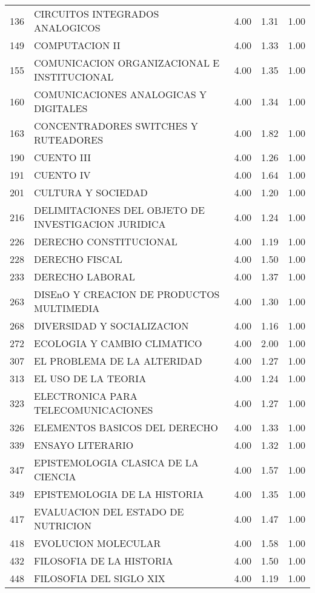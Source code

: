 \documentclass[12pt]{article}
\begin{document}
\begin{table}[ht]
\begin{tabular}{rlrrr}
  136 & CIRCUITOS INTEGRADOS ANALOGICOS & 4.00 & 1.31 & 1.00 \\ 
  149 & COMPUTACION II & 4.00 & 1.33 & 1.00 \\ 
  155 & COMUNICACION ORGANIZACIONAL E INSTITUCIONAL & 4.00 & 1.35 & 1.00 \\ 
  160 & COMUNICACIONES ANALOGICAS Y DIGITALES & 4.00 & 1.34 & 1.00 \\ 
  163 & CONCENTRADORES SWITCHES Y RUTEADORES & 4.00 & 1.82 & 1.00 \\ 
  190 & CUENTO III & 4.00 & 1.26 & 1.00 \\ 
  191 & CUENTO IV & 4.00 & 1.64 & 1.00 \\ 
  201 & CULTURA Y SOCIEDAD & 4.00 & 1.20 & 1.00 \\ 
  216 & DELIMITACIONES DEL OBJETO DE INVESTIGACION JURIDICA & 4.00 & 1.24 & 1.00 \\ 
  226 & DERECHO CONSTITUCIONAL & 4.00 & 1.19 & 1.00 \\ 
  228 & DERECHO FISCAL & 4.00 & 1.50 & 1.00 \\ 
  233 & DERECHO LABORAL & 4.00 & 1.37 & 1.00 \\ 
  263 & DISEnO Y CREACION DE PRODUCTOS MULTIMEDIA & 4.00 & 1.30 & 1.00 \\ 
  268 & DIVERSIDAD Y SOCIALIZACION & 4.00 & 1.16 & 1.00 \\ 
  272 & ECOLOGIA Y CAMBIO CLIMATICO & 4.00 & 2.00 & 1.00 \\ 
  307 & EL PROBLEMA DE LA ALTERIDAD & 4.00 & 1.27 & 1.00 \\ 
  313 & EL USO DE LA TEORIA & 4.00 & 1.24 & 1.00 \\ 
  323 & ELECTRONICA PARA TELECOMUNICACIONES & 4.00 & 1.27 & 1.00 \\ 
  326 & ELEMENTOS BASICOS DEL DERECHO & 4.00 & 1.33 & 1.00 \\ 
  339 & ENSAYO LITERARIO & 4.00 & 1.32 & 1.00 \\ 
  347 & EPISTEMOLOGIA CLASICA DE LA CIENCIA & 4.00 & 1.57 & 1.00 \\ 
  349 & EPISTEMOLOGIA DE LA HISTORIA & 4.00 & 1.35 & 1.00 \\ 
  417 & EVALUACION DEL ESTADO DE NUTRICION & 4.00 & 1.47 & 1.00 \\ 
  418 & EVOLUCION MOLECULAR & 4.00 & 1.58 & 1.00 \\ 
  432 & FILOSOFIA DE LA HISTORIA & 4.00 & 1.50 & 1.00 \\ 
  448 & FILOSOFIA DEL SIGLO XIX & 4.00 & 1.19 & 1.00 \\ 

\end{tabular}
\end{table}
\end{document}
